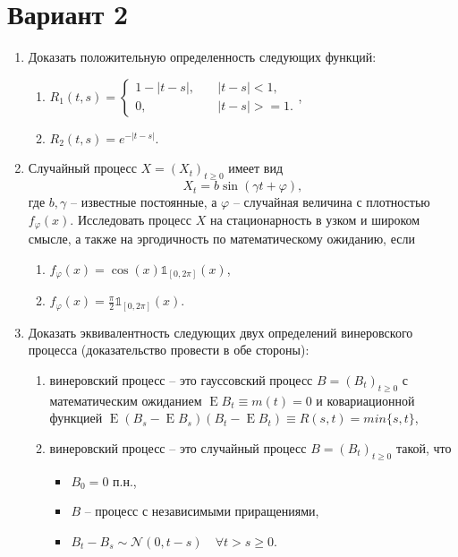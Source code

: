 \documentclass[a4paper,14pt]{extreport}
\renewcommand{\=}[1]{\stackrel{#1}{=}} %
\newcommand{\Expect}{\mathop{{}\mathrm{E}}}
\newcommand{\generaltime}{t \geqslant 0}
\newcommand{\newprocess}[1]{
	\ensuremath{
		#1 = \left(#1 _t\right)_{\generaltime}
	}
}
\begin{document}
\newpage 

\section*{Вариант 2}


\begin{enumerate}

\item Доказать положительную определенность следующих функций:
	\begin{enumerate}
		\item $R_1(t, s) = 
			\begin{cases}
				1 - |t - s|, \quad & |t - s| < 1, \\
				0, \quad & |t - s| >= 1.
			\end{cases}$,
		\item $R_2(t, s) = e^{- |t - s|}$.
	\end{enumerate}

\item Случайный процесс $\newprocess{X}$ имеет вид
\[
X_t = b \sin (\gamma t + \varphi),
\]
где $b, \gamma$ -- известные постоянные, а $\varphi$ -- 
случайная величина с плотностью $f_{\varphi}(x)$. Исследовать
процесс $X$ на стационарность в узком и широком смысле,
а также на эргодичность по математическому ожиданию,
если 
	\begin{enumerate}
		\item $f_{\varphi}(x) = \cos(x) \mathds{1}_{[0, 2 \pi]}(x)$,
		\item $f_{\varphi}(x) = \frac{\pi}{2} \mathds{1}_{[0, 2 \pi]}(x)$.
	\end{enumerate}

\item Доказать эквивалентность следующих двух определений
винеровского процесса (доказательство провести в обе стороны):
	\begin{enumerate}
		\item винеровский процесс -- это гауссовский
		процесс $\newprocess{B}$ с математическим ожиданием
		$\Expect B_t \equiv m(t) = 0$ и ковариационной
		функцией $\Expect (B_s - \Expect B_s) (B_t - \Expect B_t)
		\equiv R(s, t) = min\{s, t\}$,
		\item винеровский процесс -- это случайный процесс $\newprocess{B}$ такой, что
		\begin{itemize}
    		\item $B_0 = 0$ п.н.,
    		\item $B$ -- процесс с независимыми приращениями,
    		\item $B_t - B_s \sim \mathcal{N}(0, t - s) \quad \forall t > s \geqslant 0$.
		\end{itemize}
	\end{enumerate}


\end{enumerate}
\end{document}
